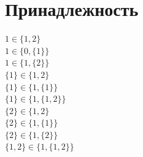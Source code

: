 \documentclass[12pt]{article}
\begin{document}
\section{Принадлежность}
$1 \in \{1,2\}$\\
$1 \in \{0,\{1\}\}$\\
$1 \in \{1,\{2\}\}$\\	
$\{1\} \in \{1,2\}$\\
$\{1\} \in \{1,\{1\}\}$\\
$\{1\} \in \{1,\{1,2\}\}$\\
$\{2\} \in \{1,2\}$\\
$\{2\} \in \{1,\{1\}\}$\\
$\{2\} \in \{1,\{2\}\}$\\
$\{1,2\} \in \{1,\{1,2\}\}$\\
\end{document}
